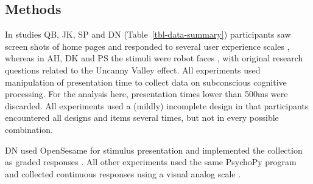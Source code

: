 \documentclass[
  authoryear,
  review]{elsarticle}
\begin{document}
\subsection{Methods}\label{methods}

In studies QB, JK, SP and DN (Table~\ref{tbl-data-summary}) participants
saw screen shots of home pages and responded to several user experience
scales \citep[\citet{JK}, \citet{SP}, \citet{DN}]{QB}, whereas in AH, DK
and PS the stimuli were robot faces \citep[\citet{DK}, \citet{PS}]{AH},
with original research questions related to the Uncanny Valley effect.
All experiments used manipulation of presentation time to collect data
on subconscious cognitive processing. For the analysis here,
presentation times lower than 500ms were discarded. All experiments used
a (mildly) incomplete design in that participants encountered all
designs and items several times, but not in every possible combination.

DN used OpenSesame for stimulus presentation and implemented the
collection as graded responses \citep{OpenSesame}. All other experiments
used the same PsychoPy program and collected continuous responses using
a visual analog scale \citep{Peirce2008}.
\end{document}
